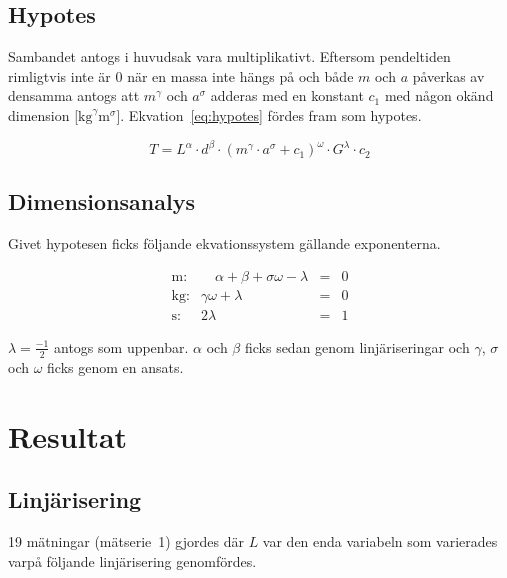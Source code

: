 \documentclass[a4paper,12pt]{article}
\begin{document}
\subsection{Hypotes}

Sambandet antogs i huvudsak vara multiplikativt. Eftersom pendeltiden rimligtvis
inte är 0 när en massa inte hängs på och både $m$ och $a$ påverkas av densamma
antogs att $m^\gamma$ och $a^\sigma$ adderas med en konstant $c_1$ med någon
okänd dimension [$\si{\kilogram}^\gamma\si{\meter}^\sigma$]. Ekvation~\eqref{eq:hypotes}
fördes fram som hypotes.

\begin{equation}
  T = L^\alpha \cdot d^\beta \cdot (m^\gamma \cdot a^\sigma + c_1)^\omega \cdot G^\lambda \cdot c_2
  \label{eq:hypotes}
\end{equation}

\subsection{Dimensionsanalys}

Givet hypotesen ficks följande ekvationssystem gällande exponenterna.

\begin{equation}
  \begin{array}{rrcc}
    \text{m:} & \hspace{1em} \alpha + \beta + \sigma \omega - \lambda & = & 0 \\
    \text{kg:} & \gamma \omega + \lambda & = & 0 \\
    \text{s:} & 2\lambda & = & 1
  \end{array}
  \label{eq:system}
\end{equation}

$\lambda = \frac{-1}{2}$ antogs som uppenbar. $\alpha$ och $\beta$ ficks sedan genom
linjäriseringar och $\gamma$, $\sigma$ och $\omega$ ficks genom en ansats.


\section{Resultat}

\subsection{Linjärisering}

19 mätningar (mätserie~1) gjordes där $L$ var den enda variabeln som varierades
varpå följande linjärisering genomfördes.
\end{document}
